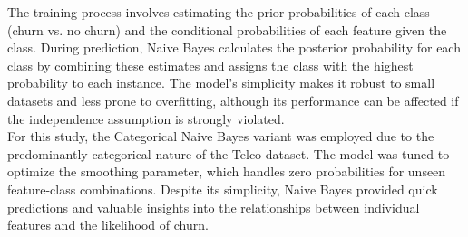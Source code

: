 The training process involves estimating the prior probabilities of each class (churn vs. no churn) and the conditional probabilities of each feature given the class. During prediction, Naive Bayes calculates the posterior probability for each class by combining these estimates and assigns the class with the highest probability to each instance. The model's simplicity makes it robust to small datasets and less prone to overfitting, although its performance can be affected if the independence assumption is strongly violated.\\

For this study, the Categorical Naive Bayes variant was employed due to the predominantly categorical nature of the Telco dataset. The model was tuned to optimize the smoothing parameter, which handles zero probabilities for unseen feature-class combinations. Despite its simplicity, Naive Bayes provided quick predictions and valuable insights into the relationships between individual features and the likelihood of churn.